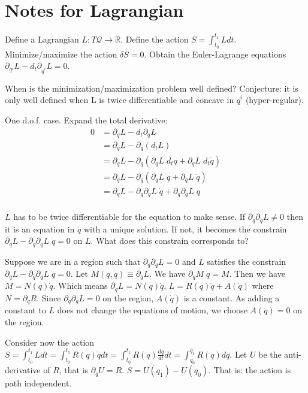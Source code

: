\documentclass[aps,pra,10pt,twocolumn,floatfix,nofootinbib]{revtex4-1}
\theoremstyle{definition}
\begin{document}
\section{Notes for Lagrangian}

Define a Lagrangian $L : T\mathcal{Q} \rightarrow \mathbb{R}$. Define the action $S = \int_{t_0}^{t_1} L dt$. Minimize/maximize the action $\delta S = 0$. Obtain the Euler-Lagrange equations $\partial_{q^i}L-d_t \partial_{\dot{q}^i}L=0$.

When is the minimization/maximization problem well defined? Conjecture: it is only well defined when L is twice differentiable and concave in $\dot{q}^i$ (hyper-regular).

One d.o.f. case. Expand the total derivative:
\begin{align*}
0&=\partial_{q}L-d_t \partial_{\dot{q}}L \\
&=\partial_{q}L- \partial_{\dot{q}} (d_tL) \\
&=\partial_{q}L- \partial_{\dot{q}} (\partial_{q}L \; d_t q + \partial_{\dot{q}}L \; d_t \dot{q}) \\
&=\partial_{q}L- \partial_{\dot{q}} (\partial_{q}L \; \dot{q} + \partial_{\dot{q}}L \; \ddot{q}) \\
&=\partial_{q}L- \partial_{\dot{q}} \partial_{q}L \; \dot{q} + \partial_{\dot{q}}\partial_{\dot{q}}L \; \ddot{q} \\
\end{align*}

$L$ has to be twice differentiable for the equation to make sense. If $\partial_{\dot{q}}\partial_{\dot{q}}L \neq 0$ then it is an equation in $\ddot{q}$ with a unique solution. If not, it becomes the constrain $\partial_{q}L- \partial_{\dot{q}} \partial_{q}L \; \dot{q} = 0$ on $L$. What does this constrain corresponds to?

Suppose we are in a region such that $\partial_{\dot{q}}\partial_{\dot{q}}L = 0$ and $L$ satisfies the constrain $\partial_{q}L- \partial_{\dot{q}} \partial_{q}L \; \dot{q} = 0$. Let $M(q, \dot{q}) \equiv \partial_{q}L$. We have $\partial_{\dot{q}} M \; \dot{q} = M$. Then we have $M=N(q)\dot{q}$. Which means $\partial_{q}L = N(q)\dot{q}$, $L = R(q) \dot{q} + A(\dot{q})$ where $N = \partial_q R$. Since $\partial_{\dot{q}}\partial_{\dot{q}}L = 0$ on the region, $A(\dot{q})$ is a constant. As adding a constant to $L$ does not change the equations of motion, we choose $A(\dot{q})=0$ on the region.

Consider now the action $S = \int_{t_0}^{t_1} L dt = \int_{t_0}^{t_1} R(q) \dot{q} dt = \int_{t_0}^{t_1} R(q) \frac{dq}{dt} dt = \int_{q_0}^{q_1} R(q) dq$. Let $U$ be the anti-derivative of $R$, that is $\partial_q U = R$. $S = U(q_1) - U(q_0)$. That is: the action is path independent.
\end{document}
